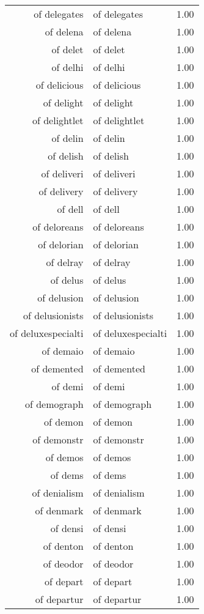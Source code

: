 \begin{table}[ht]
\begin{tabular}{rlr}
  of delegates & of delegates & 1.00 \\ 
  of delena & of delena & 1.00 \\ 
  of delet & of delet & 1.00 \\ 
  of delhi & of delhi & 1.00 \\ 
  of delicious & of delicious & 1.00 \\ 
  of delight & of delight & 1.00 \\ 
  of delightlet & of delightlet & 1.00 \\ 
  of delin & of delin & 1.00 \\ 
  of delish & of delish & 1.00 \\ 
  of deliveri & of deliveri & 1.00 \\ 
  of delivery & of delivery & 1.00 \\ 
  of dell & of dell & 1.00 \\ 
  of deloreans & of deloreans & 1.00 \\ 
  of delorian & of delorian & 1.00 \\ 
  of delray & of delray & 1.00 \\ 
  of delus & of delus & 1.00 \\ 
  of delusion & of delusion & 1.00 \\ 
  of delusionists & of delusionists & 1.00 \\ 
  of deluxespecialti & of deluxespecialti & 1.00 \\ 
  of demaio & of demaio & 1.00 \\ 
  of demented & of demented & 1.00 \\ 
  of demi & of demi & 1.00 \\ 
  of demograph & of demograph & 1.00 \\ 
  of demon & of demon & 1.00 \\ 
  of demonstr & of demonstr & 1.00 \\ 
  of demos & of demos & 1.00 \\ 
  of dems & of dems & 1.00 \\ 
  of denialism & of denialism & 1.00 \\ 
  of denmark & of denmark & 1.00 \\ 
  of densi & of densi & 1.00 \\ 
  of denton & of denton & 1.00 \\ 
  of deodor & of deodor & 1.00 \\ 
  of depart & of depart & 1.00 \\ 
  of departur & of departur & 1.00 \\ 

\end{tabular}
\end{table}
